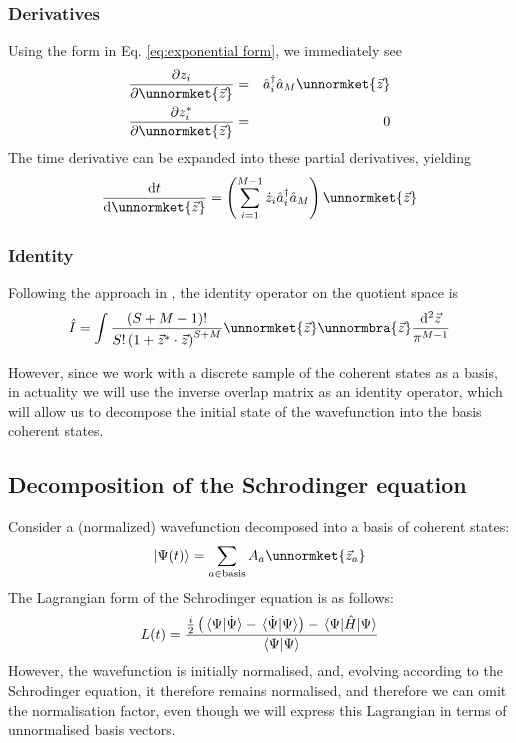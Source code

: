 \documentclass[12pt]{article}
\begin{document}
	\subsubsection{Derivatives}
	Using the form in Eq. \ref{eq:exponential form}, we immediately see
	\begin{eqnarray}
	\pdv{z_i}\unnormket{\vec{z}}&=&\hat{a}^\dagger_i\hat{a}_M\unnormket{\vec{z}}\\
	\pdv{z^*_i}\unnormket{\vec{z}}&=&0
	\end{eqnarray}
	The time derivative can be expanded into these partial derivatives, yielding
	\begin{equation}\label{eq:time derivative}
	\dv{t}\unnormket{\vec{z}}=\left(\sum_{i=1}^{M-1}\dot{z}_i\hat{a}^\dagger_i\hat{a}_M\right)\unnormket{\vec{z}}
	\end{equation}
	
	\subsubsection{Identity}
	Following the approach in \cite{Aguiar}, the identity operator on the quotient space is
	\begin{equation}\label{eq:continuous identity}
	\hat{I}=\int \frac{(S+M-1)!}{S!\left(1+\vec{z}^*\cdot\vec{z}\right)^{S+M}}\unnormket{\vec{z}}\unnormbra{\vec{z}}\frac{\dd^2\vec{z}}{\pi^{M-1}}
	\end{equation}
	
	However, since we work with a discrete sample of the coherent states as a basis, in actuality we will use the inverse overlap matrix as an identity operator, which will allow us to decompose the initial state of the wavefunction into the basis coherent states.
	
	\subsection{Decomposition of the Schrodinger equation}
	Consider a (normalized) wavefunction decomposed into a basis of coherent states:
	\begin{equation}\label{eq:decomposition}
	\ket{\Psi(t)}=\sum_{a\in\text{basis}}A_a\unnormket{\vec{z}_a}
	\end{equation}
	The Lagrangian form of the Schrodinger equation is as follows\cite{grossmann}:
	\begin{equation}\label{eq:general lagrangian}
	L(t)=\frac{\frac{i}{2}\left(\braket*{\Psi}{\dot{\Psi}}-\braket*{\dot{\Psi}}{\Psi}\right)-\mel{\Psi}{\hat{H}}{\Psi}}{\braket{\Psi}{\Psi}}
	\end{equation}
	However, the wavefunction is initially normalised, and, evolving according to the Schrodinger equation, it therefore remains normalised, and therefore we can omit the normalisation factor, even though we will express this Lagrangian in terms of unnormalised basis vectors.
	
\end{document}
